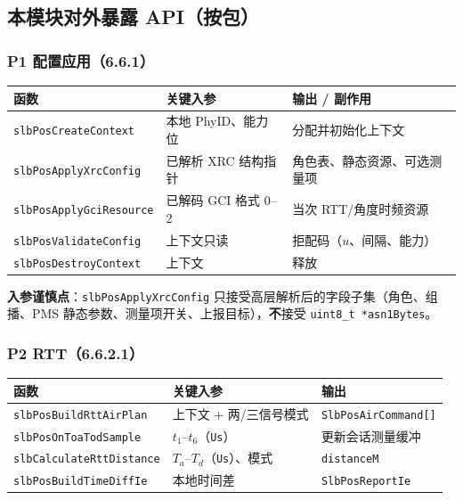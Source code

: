 \documentclass[11pt,a4paper]{ctexart}
\begin{document}
\subsection{本模块对外暴露 API（按包）}

\subsubsection{P1 配置应用（6.6.1）}

\begin{table}[h]
\centering
\small
\begin{tabular}{L{4.2cm}L{4.0cm}L{5.0cm}}
\toprule
\textbf{函数} & \textbf{关键入参} & \textbf{输出 / 副作用} \\
\midrule
\texttt{slbPosCreateContext} & 本地 PhyID、能力位 & 分配并初始化上下文 \\
\texttt{slbPosApplyXrcConfig} & 已解析 XRC 结构指针 & 角色表、静态资源、可选测量项 \\
\texttt{slbPosApplyGciResource} & 已解码 GCI 格式 0--2 & 当次 RTT/角度时频资源 \\
\texttt{slbPosValidateConfig} & 上下文只读 & 拒配码（$u$、间隔、能力） \\
\texttt{slbPosDestroyContext} & 上下文 & 释放 \\
\bottomrule
\end{tabular}
\end{table}

\textbf{入参谨慎点}：\texttt{slbPosApplyXrcConfig} 只接受高层解析后的字段子集（角色、组播、PMS 静态参数、测量项开关、上报目标），\textbf{不}接受 \texttt{uint8\_t *asn1Bytes}。

\subsubsection{P2 RTT（6.6.2.1）}

\begin{table}[h]
\centering
\small
\begin{tabular}{L{4.4cm}L{4.0cm}L{4.8cm}}
\toprule
\textbf{函数} & \textbf{关键入参} & \textbf{输出} \\
\midrule
\texttt{slbPosBuildRttAirPlan} & 上下文 + 两/三信号模式 & \texttt{SlbPosAirCommand[]} \\
\texttt{slbPosOnToaTodSample} & $t_1$--$t_6$（\texttt{Us}） & 更新会话测量缓冲 \\
\texttt{slbCalculateRttDistance} & $T_a$--$T_d$（\texttt{Us}）、模式 & \texttt{distanceM} \\
\texttt{slbPosBuildTimeDiffIe} & 本地时间差 & \texttt{SlbPosReportIe} \\
\bottomrule
\end{tabular}
\end{table}
\end{document}
